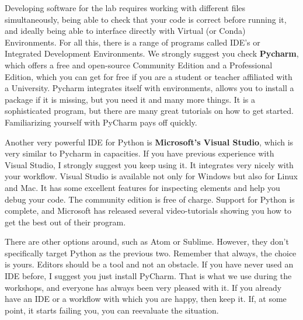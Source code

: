 Developing software for the lab requires working with different files simultaneously, being able to check that your code is correct before running it, and ideally being able to interface directly with Virtual (or Conda) Environments. For all this, there is a range of programs called IDE's or Integrated Development Environments. We strongly suggest you check \textbf{Pycharm}, which offers a free and open-source Community Edition and a Professional Edition, which you can get for free if you are a student or teacher affiliated with a University. Pycharm integrates itself with environments, allows you to install a package if it is missing, but you need it and many more things. It is a sophisticated program, but there are many great tutorials on how to get started. Familiarizing yourself with PyCharm pays off quickly.

Another very powerful IDE for Python is \textbf{Microsoft's Visual Studio}, which is very similar to Pycharm in capacities. If you have previous experience with Visual Studio, I strongly suggest you keep using it. It integrates very nicely with your workflow. Visual Studio is available not only for Windows but also for Linux and Mac. It has some excellent features for inspecting elements and help you debug your code. The community edition is free of charge. Support for Python is complete, and Microsoft has released several video-tutorials showing you how to get the best out of their program.

There are other options around, such as Atom or Sublime. However, they don't specifically target Python as the previous two. Remember that always, the choice is yours. Editors should be a tool and not an obstacle. If you have never used an IDE before, I suggest you just install PyCharm. That is what we use during the workshops, and everyone has always been very pleased with it. If you already have an IDE or a workflow with which you are happy, then keep it. If, at some point, it starts failing you, you can reevaluate the situation.

